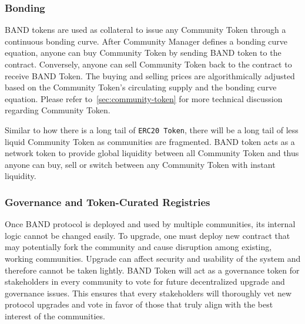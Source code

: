 \documentclass[letterpaper,11pt]{article}
\begin{document}
\subsubsection{Bonding}
BAND tokens are used as collateral to issue any Community Token through a continuous bonding curve. After Community Manager defines a bonding curve equation, anyone can buy Community Token by sending BAND token to the contract. Conversely, anyone can sell Community Token back to the contract to receive BAND Token. The buying and selling prices are algorithmically adjusted based on the Community Token's circulating supply and the bonding curve equation. Please refer to~\cref{sec:community-token} for more technical discussion regarding Community Token.

Similar to how there is a long tail of {\tt ERC20 Token}, there will be a long tail of less liquid Community Token as communities are fragmented. BAND token acts as a network token to provide global liquidity between all Community Token and thus anyone can buy, sell or switch between any Community Token with instant liquidity.


\subsubsection{Governance and Token-Curated Registries}
Once BAND protocol is deployed and used by multiple communities, its internal logic cannot be changed easily. To upgrade, one must deploy new contract that may potentially fork the community and cause disruption among existing, working communities. Upgrade can affect security and usability of the system and therefore cannot be taken lightly. BAND Token will act as a governance token for stakeholders in every community to vote for future decentralized upgrade and governance issues. This ensures that every stakeholders will thoroughly vet new protocol upgrades and vote in favor of those that truly align with the best interest of the communities.
\end{document}
